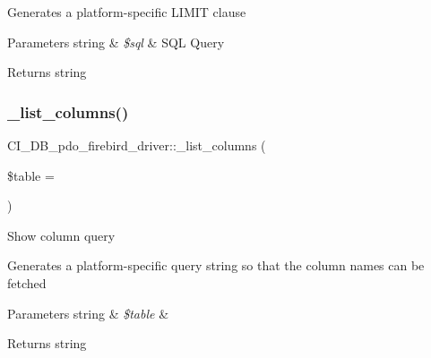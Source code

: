 Generates a platform-\/specific L\+I\+M\+IT clause


\begin{DoxyParams}[1]{Parameters}
string & {\em \$sql} & S\+QL Query \\
\hline
\end{DoxyParams}
\begin{DoxyReturn}{Returns}
string 
\end{DoxyReturn}
\mbox{\label{class_c_i___d_b__pdo__firebird__driver_a39f58179fa04d1dd0365f9864cd4c9ca}} 
\subsubsection{\texorpdfstring{\+\_\+list\+\_\+columns()}{\_list\_columns()}}
{\footnotesize\ttfamily C\+I\+\_\+\+D\+B\+\_\+pdo\+\_\+firebird\+\_\+driver\+::\+\_\+list\+\_\+columns (\begin{DoxyParamCaption}\item[{}]{\$table = {\ttfamily \textquotesingle{}\textquotesingle{}} }\end{DoxyParamCaption})\hspace{0.3cm}{\ttfamily [protected]}}

Show column query

Generates a platform-\/specific query string so that the column names can be fetched


\begin{DoxyParams}[1]{Parameters}
string & {\em \$table} & \\
\hline
\end{DoxyParams}
\begin{DoxyReturn}{Returns}
string 
\end{DoxyReturn}
\mbox{\label{class_c_i___d_b__pdo__firebird__driver_a6c65282e6bea11304843318c665f29f9}} 
